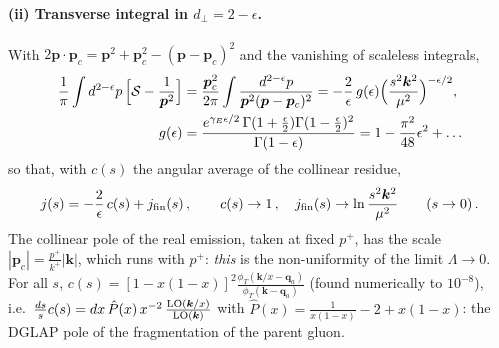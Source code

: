 \documentclass[11pt,a4paper]{article}
\renewcommand{\v}[1]{\bm{#1}}
\begin{document}
\paragraph{(ii) Transverse integral in $d_\perp=2-\epsilon$.} With $2\v p\cdot\v p_c=\v p^2+\v p_c^2-(\v p-\v p_c)^2$ and the vanishing of scaleless integrals,
\begin{align}
\frac1\pi\int d^{2-\epsilon}p\,\Big[\mathcal S-\frac1{\v p^2}\Big]&=\frac{\v p_c^2}{2\pi}\int\frac{d^{2-\epsilon}p}{\v p^2(\v p-\v p_c)^2}
=-\frac2\epsilon\,g(\epsilon)\Big(\frac{s^2\v k^2}{\mu^2}\Big)^{-\epsilon/2},\notag\\ g(\epsilon)&=\frac{e^{\gamma_E\epsilon/2}\,\Gamma(1+\frac\epsilon2)\Gamma(1-\frac\epsilon2)^2}{\Gamma(1-\epsilon)}=1-\frac{\pi^2}{48}\epsilon^2+\dots\label{softint}
\end{align}
so that, with $c(s)$ the angular average of the collinear residue,
\begin{align}
j(s)=-\frac2\epsilon\,c(s)+j_{\rm fin}(s)\,,\qquad c(s)\to1\,,\quad j_{\rm fin}(s)\to\ln\frac{s^2\v k^2}{\mu^2}\qquad(s\to0)\,.\label{jsmall}
\end{align}
The collinear pole of the real emission, taken at fixed $p^+$, has the scale $|\v p_c|=\frac{p^+}{k^+}|\v k|$, which runs with $p^+$: \emph{this} is the non-uniformity of the limit $\Lambda\to0$. For all $s$, $c(s)=[1-x(1-x)]^2\frac{\phi_T(\v k/x-\v q_a)}{\phi_T(\v k-\v q_a)}$ (found numerically to $10^{-8}$), i.e.\ $\frac{ds}{s}c(s)=dx\,\hat P(x)\,x^{-2}\,\frac{{\rm LO}(\v k/x)}{{\rm LO}(\v k)}$ with $\hat P(x)=\frac{1}{x(1-x)}-2+x(1-x)$: the DGLAP pole of the fragmentation of the parent gluon.
\end{document}

